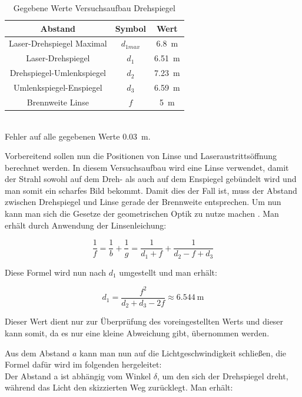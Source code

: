 \begin{table}[h]
    \centering
    \caption{Gegebene Werte Versuchsaufbau Drehspiegel}
    \begin{tabular}{c c c}
    \hline
    Abstand & Symbol & Wert \\
    \hline
    Laser-Drehspiegel Maximal & $d_{1max}$ & \SI{6.8}{\metre} \\
    Laser-Drehspiegel & $d_1$ & \SI{6.51}{\metre}\\
    Drehspiegel-Umlenkspiegel & $d_2$ & \SI{7.23}{\metre}\\
    Umlenkspiegel-Enspiegel & $d_3$ & \SI{6.59}{\metre}\\
    Brennweite Linse & $f$ & \SI{5}{\metre}\\
    
    \hline
    \end{tabular}
    \label{tab:Drehspiegel vorgegebene Werte}\\
    Fehler auf alle gegebenen Werte \SI{0.03}{\metre}.
\end{table}

Vorbereitend sollen nun die Positionen von Linse und Laseraustrittsöffnung berechnet werden. In diesem Versuchsaufbau wird eine Linse verwendet, damit der Strahl sowohl auf dem Dreh- als auch auf dem Enspiegel gebündelt wird und man somit ein scharfes Bild bekommt. Damit dies der Fall ist, muss der Abstand zwischen Drehspiegel und Linse gerade der Brennweite entsprechen. Um nun kann man sich die Gesetze der geometrischen Optik zu nutze machen \cite{2}. Man erhält durch Anwendung der Linsenleichung: 

\begin{equation}
    \frac{1}{f} = \frac{1}{b} + \frac{1}{g} = \frac{1}{d_1 + f} + \frac{1}{d_2 - f + d_3}
\end{equation}

Diese Formel wird nun nach $d_1$ umgestellt und man erhält:

\begin{equation}
    d_1 = \frac{f^2}{d_2+d_3-2f} \approx \SI{6.544}{\metre}
\end{equation}

Dieser Wert dient nur zur Überprüfung des voreingestellten Werts und dieser kann somit, da es nur eine kleine Abweichung gibt, übernommen werden.

Aus dem Abstand $a$ kann man nun auf die Lichtgeschwindigkeit schließen, die Formel dafür wird im folgenden hergeleitet:\\
Der Abstand a ist abhängig vom Winkel $\delta$, um den sich der Drehspiegel dreht, während das Licht den skizzierten Weg zurücklegt. Man erhält:

